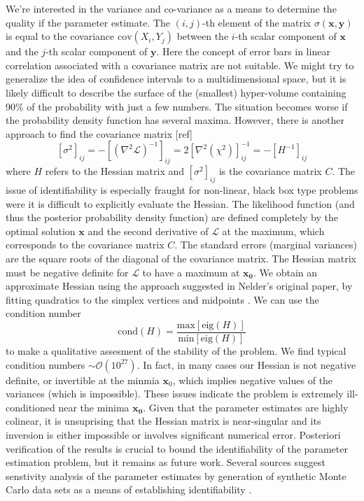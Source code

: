 \documentclass[12pt,a4paper,oneside]{book}
\begin{document}
We're interested in the variance and co-variance as a means to determine the quality if the parameter estimate. The $\left( i, j \right)$-th element of the matrix $\sigma (\mathbf{x}, \mathbf{y})$ is equal to the covariance $\mbox{cov}(X_i, Y_j)$ between the $i$-th scalar component of $\mathbf{x}$ and the $j$-th scalar component of $\mathbf{y}$. Here the concept of error bars in linear correlation associated with a covariance matrix are not suitable. We might try to generalize the idea of confidence intervals to a multidimensional space, but it is likely difficult to describe the surface of the (smallest) hyper-volume containing 90\% of the probability with just a few numbers. The situation becomes worse if the probability density function has several maxima. However, there is another approach to find the covariance matrix [ref] 
\[ \left[\sigma^2 \right]_{ij} = -\left[ \left( \nabla^2 \mathcal{L}\right)^{-1}\right]_{ij} = 2 \left[ \nabla^2 \left( \chi^2\right)\right]_{ij}^{-1} = -\left[H^{-1} \right]_{ij}\]
where $H$ refers to the Hessian matrix and $\left[\sigma^2 \right]_{ij}$ is the covariance matrix $C$. The issue of identifiability is especially fraught for non-linear, black box type problems were it is difficult to explicitly evaluate the Hessian. 
The likelihood function (and thus the posterior probability density function) are defined completely by the optimal solution $\mathbf{x}$ and the second derivative of $\mathcal{L}$ at the maximum, which corresponds to the covariance matrix $C$. The standard errors (marginal variances) are the square roots of the diagonal of the covariance matrix. The Hessian matrix must be negative definite for $\mathcal{L}$ to have a maximum at $\mathbf{x_0}$. We obtain an approximate Hessian using the approach suggested in Nelder's original paper, by fitting quadratics to the simplex vertices and midpoints \cite{nelder_simplex_1965}\cite{spendley_sequential_1962}. We can use the condition number
\[ \mbox{cond} (H) = \frac{\mbox{max}[\mbox{eig}(H)]}{\mbox{min}[\mbox{eig}(H)]} \]
to make a qualitative assesment of the stability of the problem. We find typical condition numbers $\sim \mathcal{O}(10^{27})$. In fact, in many cases our Hessian is not negative definite, or invertible at the minmia $\mathbf{x}_0$, which implies negative values of the variances (which is impossible). These issues indicate the problem is extremely ill-conditioned near the minima $\mathbf{x_0}$. Given that the parameter estimates are highly colinear, it is unsuprising that the Hessian matrix is near-singular and its inversion is either impossible or involves significant numerical error. Posteriori verification of the results is crucial to bound the identifiability of the parameter estimation problem, but it remains as future work. Several sources suggest senstivity analysis of the parameter estimates by generation of synthetic Monte Carlo data sets as a means of establishing identifiability \cite{bevington_data_1969}\cite{jaqaman_linking_2006}.
\end{document}
